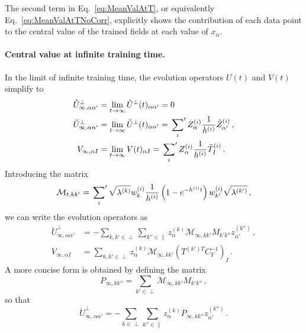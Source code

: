 \documentclass[11pt]{article}
\begin{document}
The second term in Eq.~\eqref{eq:MeanValAtT}, or equivalently Eq.~\eqref{eq:MeanValAtTNoCorr}, explicitly shows the contribution
of each data point to the central value of the
trained fields at each value of $x_{\alpha}$.

\paragraph{Central value at infinite training time.}

In the limit of infinite training time, the evolution operators $U(t)$ and $V(t)$ simplify to
\begin{align}
    \hat{U}^\perp_{\infty, \alpha\alpha'}
        &= \lim_{t\to\infty}\hat{U}^\perp(t)_{\alpha\alpha'} = 0\, \\
    \check{U}^\perp_{\infty,\alpha\alpha'}
        &= \lim_{t\to\infty}\check{U}^\perp(t)_{\alpha\alpha'}
            = \sideset{}{'}\sum_{i} Z^{(i)}_{\alpha} \frac{1}{h^{(i)}} \tilde{Z}^{(i)}_{\alpha'}\, , \\
    V_{\infty,\alpha I}
        &= \lim_{t\to\infty}V(t)_{\alpha I}
            = \sideset{}{'}\sum_{i} Z^{(i)}_{\alpha} \frac{1}{h^{(i)}} \tilde{T}^{(i)}_{I}\, .
\end{align}
Introducing the matrix
\begin{align}
    \label{eq:calMDef}
    \mathcal{M}_{t,kk'}
        = \sideset{}{'}\sum_{i} \sqrt{\lambda^{(k)}} w^{(i)}_{k} \frac{1}{h^{(i)}}
            \left(1 - e^{-h^{(i)}t}\right) w^{(i)}_{k'} \sqrt{\lambda^{(k')}} \, ,
\end{align}
we can write the evolution operators as
\begin{align}
    \label{eq:UcheckInfty}
    \check{U}^\perp_{\infty,\alpha\alpha'}
        &= -\sum_{k,k'\in\perp} \sum_{k''\in\parallel} z^{(k)}_{\alpha} \mathcal{M}_{\infty,kk'} M_{k'k''} z^{(k'')}_{\alpha'}\, , \\
    \label{eq:VInfty}
    V_{\infty, \alpha I}
        &= \sum_{k,k'\in\perp} z^{(k)}_{\alpha} \mathcal{M}_{\infty,kk'}
            \left(T^{(k') T} C_{Y}^{-1}\right)_I \, .
\end{align}
A more concise form is obtained by defining the matrix
\begin{equation}
    \label{eq:PInftyDef}
    P_{\infty,kk''} = \sum_{k'\in\perp} \mathcal{M}_{\infty,kk'} M_{k'k''}\, ,
\end{equation}
so that
\begin{equation}
    \label{eq:UcheckInftyV2}
    \check{U}^\perp_{\infty,\alpha\alpha'} = -\sum_{k\in\perp} \sum_{k''\in\parallel} z^{(k)}_{\alpha} P_{\infty,kk''} z^{(k'')}_{\alpha'}\, .
\end{equation}
\end{document}
